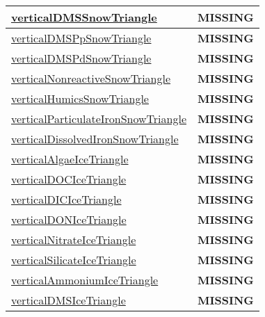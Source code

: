 {\begin{center}
\begin{longtable}{| p{2.0in} | p{4.0in} |}
    \hline
    \hyperref[subsec:var_sec_tracer_triangles_verticalDMSSnowTriangle]{verticalDMSSnowTriangle} & {\bf \color{red} MISSING} \\
    \hline
    \hyperref[subsec:var_sec_tracer_triangles_verticalDMSPpSnowTriangle]{verticalDMSPpSnowTriangle} & {\bf \color{red} MISSING} \\
    \hline
    \hyperref[subsec:var_sec_tracer_triangles_verticalDMSPdSnowTriangle]{verticalDMSPdSnowTriangle} & {\bf \color{red} MISSING} \\
    \hline
    \hyperref[subsec:var_sec_tracer_triangles_verticalNonreactiveSnowTriangle]{verticalNonreactiveSnowTriangle} & {\bf \color{red} MISSING} \\
    \hline
    \hyperref[subsec:var_sec_tracer_triangles_verticalHumicsSnowTriangle]{verticalHumicsSnowTriangle} & {\bf \color{red} MISSING} \\
    \hline
    \hyperref[subsec:var_sec_tracer_triangles_verticalParticulateIronSnowTriangle]{verticalParticulateIronSnow\-Triangle} & {\bf \color{red} MISSING} \\
    \hline
    \hyperref[subsec:var_sec_tracer_triangles_verticalDissolvedIronSnowTriangle]{verticalDissolvedIronSnow\-Triangle} & {\bf \color{red} MISSING} \\
    \hline
    \hyperref[subsec:var_sec_tracer_triangles_verticalAlgaeIceTriangle]{verticalAlgaeIceTriangle} & {\bf \color{red} MISSING} \\
    \hline
    \hyperref[subsec:var_sec_tracer_triangles_verticalDOCIceTriangle]{verticalDOCIceTriangle} & {\bf \color{red} MISSING} \\
    \hline
    \hyperref[subsec:var_sec_tracer_triangles_verticalDICIceTriangle]{verticalDICIceTriangle} & {\bf \color{red} MISSING} \\
    \hline
    \hyperref[subsec:var_sec_tracer_triangles_verticalDONIceTriangle]{verticalDONIceTriangle} & {\bf \color{red} MISSING} \\
    \hline
    \hyperref[subsec:var_sec_tracer_triangles_verticalNitrateIceTriangle]{verticalNitrateIceTriangle} & {\bf \color{red} MISSING} \\
    \hline
    \hyperref[subsec:var_sec_tracer_triangles_verticalSilicateIceTriangle]{verticalSilicateIceTriangle} & {\bf \color{red} MISSING} \\
    \hline
    \hyperref[subsec:var_sec_tracer_triangles_verticalAmmoniumIceTriangle]{verticalAmmoniumIceTriangle} & {\bf \color{red} MISSING} \\
    \hline
    \hyperref[subsec:var_sec_tracer_triangles_verticalDMSIceTriangle]{verticalDMSIceTriangle} & {\bf \color{red} MISSING} \\

\end{longtable}
\end{center}}
